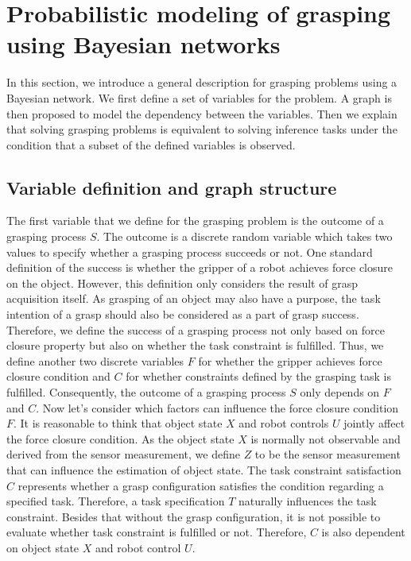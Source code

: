 \section{Probabilistic modeling of grasping using Bayesian networks}
In this section, we introduce a general description for grasping problems using a Bayesian network. We first define a set of variables for the problem. A graph is then proposed to model the dependency between the variables. Then we explain that solving grasping problems is equivalent to solving inference tasks under the condition that a subset of the defined variables is observed.   
\subsection{Variable definition and graph structure}
The first variable that we define for the grasping problem is the outcome of a grasping process $S$. The outcome is a discrete random variable which takes two values to specify whether a grasping process succeeds or not. One standard definition of the success is whether the gripper of a robot achieves force closure on the object. However, this definition only considers the result of grasp acquisition itself. As grasping of an object may also have a purpose, the task intention of a grasp should also be considered as a part of grasp success. Therefore, we define the success of a grasping process not only based on force closure property but also on whether the task constraint is fulfilled. Thus, we define another two discrete variables $F$ for whether the gripper achieves force closure condition and $C$ for whether constraints defined by the grasping task is fulfilled. Consequently, the outcome of a grasping process $S$ only depends on $F$ and $C$. Now let's consider which factors can influence the force closure condition $F$. It is reasonable to think that object state $X$ and robot controls $U$ jointly affect the force closure condition. As the object state $X$ is normally not observable and derived from the sensor measurement, we define $Z$ to be the sensor measurement that can influence the estimation of object state. The task constraint satisfaction $C$ represents whether a grasp configuration satisfies the condition regarding a specified task. Therefore, a task specification $T$ naturally influences the task constraint. Besides that without the grasp configuration, it is not possible to evaluate whether task constraint is fulfilled or not. Therefore, $C$ is also dependent on object state $X$ and robot control $U$.  

